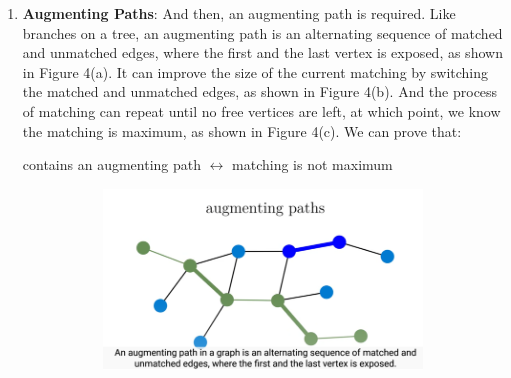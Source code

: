 \documentclass[
    a4paper, %
    10pt, %
    unnumberedsections, %
    twoside, %
]{LTJournalArticle}
\begin{document}
\begin{enumerate}
    \item \textbf{Augmenting Paths}: And then, an augmenting path is required. Like branches on a tree, an augmenting path is an alternating sequence of matched and unmatched edges, where the first and the last vertex is exposed, as shown in Figure 4(a). It can improve the size of the current matching by switching the matched and unmatched edges, as shown in Figure 4(b). And the process of matching can repeat until no free vertices are left, at which point, we know the matching is maximum, as shown in Figure 4(c). We can prove that: 
    \begin{center}
        contains an augmenting path $\leftrightarrow $ matching is not maximum
    \end{center}
    \begin{figure}[htbp] %
    \centering %
    \vspace{0cm} %
    \setlength{\abovecaptionskip}{0.cm} %
    \setlength{\belowcaptionskip}{0.cm} %
    \setlength{\belowdisplayskip}{3pt} %
    \begin{subfigure}[b]{0.45\linewidth}
        \includegraphics[width=\linewidth]{img/blossom algorithm 2.png}

\end{subfigure}
\end{figure}
\end{enumerate}
\end{document}

